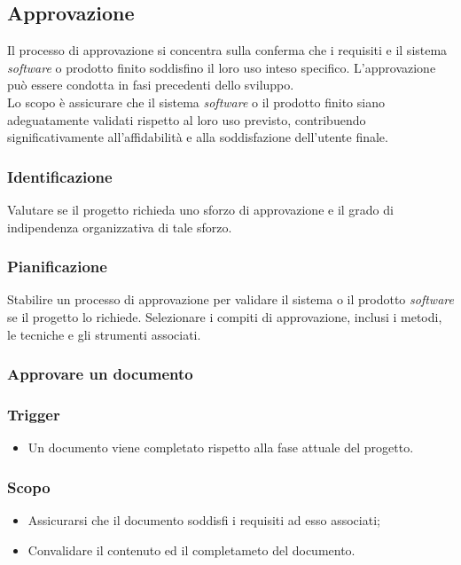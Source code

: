 \subsection{Approvazione}
\label{subsec:approvazione}
Il processo di approvazione si concentra sulla conferma che i requisiti e il
sistema \textit{software} o prodotto finito soddisfino il loro uso inteso
specifico. L'approvazione può essere condotta in fasi precedenti dello sviluppo.\\
Lo scopo è assicurare che il sistema \textit{software} o il prodotto finito
siano adeguatamente validati rispetto al loro uso previsto, contribuendo
significativamente all'affidabilità e alla soddisfazione dell'utente finale.

\subsubsection{Identificazione} 
Valutare se il progetto richieda uno sforzo
	  di approvazione e il grado di indipendenza organizzativa di tale
	  sforzo.

\subsubsection{Pianificazione} 
Stabilire un processo di approvazione per
	  validare il sistema o il prodotto \textit{software} se il progetto lo
	  richiede. Selezionare i compiti di approvazione, inclusi i metodi, le
	  tecniche e gli strumenti associati.

\subsubsection{Approvare un documento}
\label{approvazione-documento}

\subsubsection*{Trigger}
\begin{itemize}
	\item Un documento viene completato rispetto alla fase attuale del progetto.
\end{itemize}

\subsubsection*{Scopo}
\begin{itemize}
	\item Assicurarsi che il documento soddisfi i requisiti ad esso associati;

	\item Convalidare il contenuto ed il completameto del documento.
\end{itemize}

